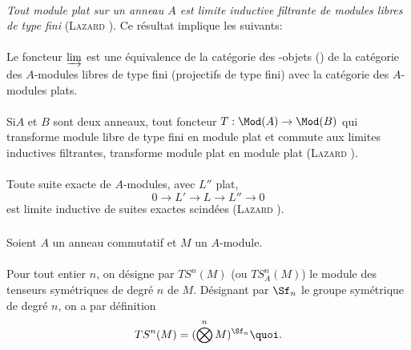 \documentclass[10pt]{../fichiers-configuration-latex/smfart}
\begin{document}
\paragraph{}
\emph{Tout module plat sur un anneau $A$ est limite inductive
filtrante de modules libres de type fini} (\textsc{Lazard} \cite[I 1.2]{SGA4-17:La}). Ce
résultat implique les suivants:

\paragraph{}
Le foncteur $\varinjlim$ est une équivalence de la catégorie des
\iInd-objets () de la catégorie des $A$-modules libres de type fini
(\resp projectifs de type fini) avec la catégorie des $A$-modules
plats.

\paragraph{}
Si\pageoriginale $A$ et $B$ sont deux anneaux, tout foncteur
$T:\Mod(A)\rightarrow \Mod(B)$ qui transforme module libre de type
fini en module plat et commute aux limites inductives filtrantes,
transforme module plat en module plat (\textsc{Lazard} \cite[I 1.5]{SGA4-17:La}).

\paragraph{}
Toute suite exacte de $A$-modules, avec $L''$ plat,
$$
0\longrightarrow L'\longrightarrow L\longrightarrow L''\longrightarrow
0
$$
est limite inductive de suites exactes scindées (\textsc{Lazard} \cite[I 2.3]{SGA4-17:La}).

\subsubsection{}
Soient $A$ un anneau commutatif et $M$ un $A$-module.

\paragraph{}
Pour tout entier $n$, on désigne par $TS^{n}(M)$ (ou $TS^{n}_A(M)$) le
module des tenseurs symétriques de degré $n$ de $M$. Désignant par
$\Sf_n$ le groupe symétrique de degré $n$, on a par définition
$$
TS^{n}(M)=(\bigotimes^{n}M)^{\Sf_n}{\quoi}.
$$
\end{document}
